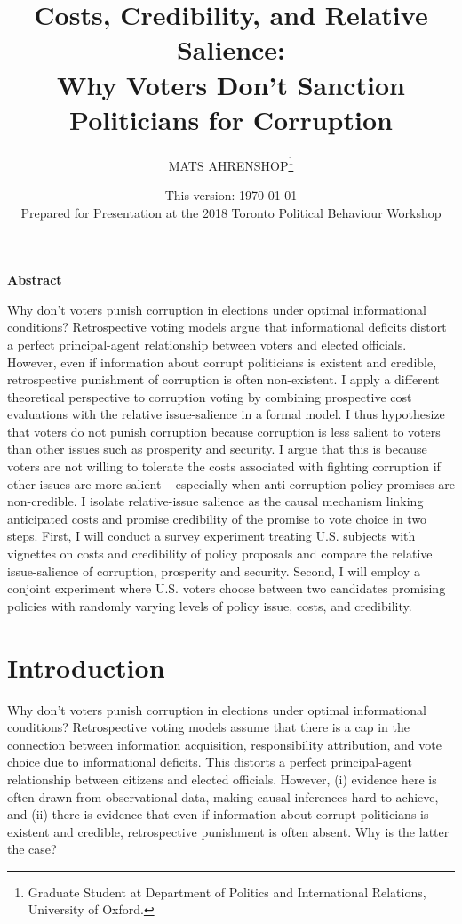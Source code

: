 \documentclass[11pt]{article}
\title{Costs, Credibility, and Relative Salience: \\ Why Voters Don't Sanction Politicians for Corruption}
\author{MATS AHRENSHOP\footnote{Graduate Student at Department of Politics and International Relations, University of Oxford.}}
\date{This version: \today \\ Prepared for Presentation at the 2018 Toronto Political Behaviour Workshop}
\begin{document}
\maketitle

\begin{onehalfspace}
\begin{center}
\textbf{Abstract}
\end{center}

\noindent Why don’t voters punish corruption in elections under optimal informational conditions? Retrospective voting models argue that informational deficits distort a perfect principal-agent relationship between voters and elected officials. However, even if information about corrupt politicians is existent and credible, retrospective punishment of corruption is often non-existent.
I apply a different theoretical perspective to corruption voting by combining prospective cost evaluations with the relative issue-salience in a formal model. I thus hypothesize that voters do not punish corruption because corruption is less salient to voters than other issues such as prosperity and security. I argue that this is because voters are not willing to tolerate the costs associated with fighting corruption if other issues are more salient -- especially when anti-corruption policy promises are non-credible.
I isolate relative-issue salience as the causal mechanism linking anticipated costs and promise credibility of the promise to vote choice in two steps. First, I will conduct a survey experiment treating U.S. subjects with vignettes on costs and credibility of policy proposals and compare the relative issue-salience of corruption, prosperity and security. Second, I will employ a conjoint experiment where U.S. voters choose between two candidates promising policies with randomly varying levels of policy issue, costs, and credibility.
\end{onehalfspace}

\newpage
\doublespacing

\section{Introduction}
Why don't voters punish corruption in elections under optimal informational conditions? Retrospective voting models assume that there is a cap in the connection between information acquisition, responsibility attribution, and vote choice due to informational deficits. This distorts a perfect principal-agent relationship between citizens and elected officials. However, (i) evidence here is often drawn from observational data, making causal inferences hard to achieve, and (ii) there is evidence that even if information about corrupt politicians is existent and credible, retrospective punishment is often absent. Why is the latter the case?
\end{document}
